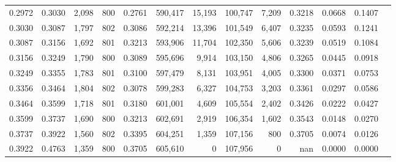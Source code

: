 \begin{tabular}{rrrrrrrrrrrrr}
0.2972 & 0.3030 &  2,098 & 800 &                                     0.2761 & 590,417 &  15,193 & 100,747 &   7,209 & 0.3218 & 0.0668 & 0.1407 \\
0.3030 & 0.3087 &  1,797 & 802 &                                     0.3086 & 592,214 &  13,396 & 101,549 &   6,407 & 0.3235 & 0.0593 & 0.1241 \\
0.3087 & 0.3156 &  1,692 & 801 &                                     0.3213 & 593,906 &  11,704 & 102,350 &   5,606 & 0.3239 & 0.0519 & 0.1084 \\
0.3156 & 0.3249 &  1,790 & 800 &                                     0.3089 & 595,696 &   9,914 & 103,150 &   4,806 & 0.3265 & 0.0445 & 0.0918 \\
0.3249 & 0.3355 &  1,783 & 801 &                                     0.3100 & 597,479 &   8,131 & 103,951 &   4,005 & 0.3300 & 0.0371 & 0.0753 \\
0.3356 & 0.3464 &  1,804 & 802 &                                     0.3078 & 599,283 &   6,327 & 104,753 &   3,203 & 0.3361 & 0.0297 & 0.0586 \\
0.3464 & 0.3599 &  1,718 & 801 &                                     0.3180 & 601,001 &   4,609 & 105,554 &   2,402 & 0.3426 & 0.0222 & 0.0427 \\
0.3599 & 0.3737 &  1,690 & 800 &                                     0.3213 & 602,691 &   2,919 & 106,354 &   1,602 & 0.3543 & 0.0148 & 0.0270 \\
0.3737 & 0.3922 &  1,560 & 802 &                                     0.3395 & 604,251 &   1,359 & 107,156 &     800 & 0.3705 & 0.0074 & 0.0126 \\
0.3922 & 0.4763 &  1,359 & 800 &                                     0.3705 & 605,610 &       0 & 107,956 &       0 &    nan & 0.0000 & 0.0000 \\
\bottomrule
\end{tabular}
